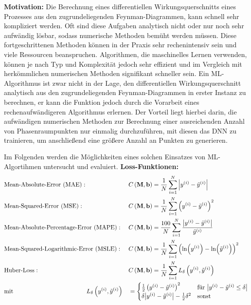 \textbf{Motivation:}
Die Berechnung eines differentiellen Wirkungsquerschnitts eines Prozesses aus den zugrundeliegenden Feynman-Diagrammen, kann schnell sehr kompliziert werden. Oft sind diese Aufgaben analytisch nicht oder nur noch sehr aufwändig lösbar, sodass numerische Methoden bemüht werden müssen. Diese fortgeschrittenen Methoden können in der Praxis sehr rechenintensiv sein und viele Ressourcen beanspruchen. Algorithmen, die maschinelles Lernen verwenden, können je nach Typ und Komplexität jedoch sehr effizient und im Vergleich mit herkömmlichen numerischen Methoden signifikant schneller sein. Ein ML-Algorithmus ist zwar nicht in der Lage, den differentiellen Wirkungsquerschnitt analytisch aus den zugrundeliegenden Feynman-Diagrammen in erster Instanz zu berechnen, er kann die Funktion jedoch durch die Vorarbeit eines rechenaufwändigeren Algorithmus erlernen. Der Vorteil liegt hierbei darin, die aufwändigen numerischen Methoden zur Berechnung einer ausreichenden Anzahl von Phasenraumpunkten nur einmalig durchzuführen, mit diesen das DNN zu trainieren, um anschließend eine größere Anzahl an Punkten zu generieren.

Im Folgenden werden die Möglichkeiten eines solchen Einsatzes von ML-Algortihmen untersucht und evaluiert.
\textbf{Loss-Funktionen:}
\begin{equation}
\begin{aligned}
&\text{Mean-Absolute-Error (MAE)}: \quad &&C\left(\mathbf{M}, \mathbf{b}\right) = \frac{1}{N} \sum_{i=1}^{N} \abs{y^{(i)} - \tilde{y}^{(i)}} \\
&\text{Mean-Squared-Error (MSE)}: \quad &&C\left(\mathbf{M}, \mathbf{b}\right) = \frac{1}{N} \sum_{i=1}^{N} \left(y^{(i)} - \tilde{y}^{(i)}\right)^2 \\
&\text{Mean-Absolute-Percentage-Error (MAPE)}: &&C\left(\mathbf{M}, \mathbf{b}\right) = \frac{100}{N} \sum_{i=1}^{N} \frac{\abs{y^{(i)} - \tilde{y}^{(i)}}  }{\tilde{y}^{(i)}}\\
&\text{Mean-Squared-Logarithmic-Error (MSLE)}: &&C\left(\mathbf{M}, \mathbf{b}\right) = \frac{1}{N} \sum_{i=1}^{N} \left(\ln(y^{(i)}) - \ln(\tilde{y}^{(i)})\right)^2 \\
&\text{Huber-Loss}: &&C\left(\mathbf{M}, \mathbf{b}\right) = \frac{1}{N} \sum_{i=1}^{N} L_{\delta}\left(y^{(i)}, \tilde{y}^{(i)}\right)\\
&\text{mit}\qquad \qquad \qquad \qquad \qquad \qquad L_{\delta}\left(y^{(i)}, \tilde{y}^{(i)}\right)&&=\begin{cases}
\frac{1}{2}\left(y^{(i)} -  \tilde{y}^{(i)}\right)^2 \quad &\text{für}~\abs{y^{(i)} -  \tilde{y}^{(i)} \leq \delta} \\
\delta \abs{y^{(i)} -  \tilde{y}^{(i)}} - \frac{1}{2}\delta^2 &\text{sonst}
\end{cases}
\end{aligned}
\label{Loss-Funktionen}
\end{equation}

